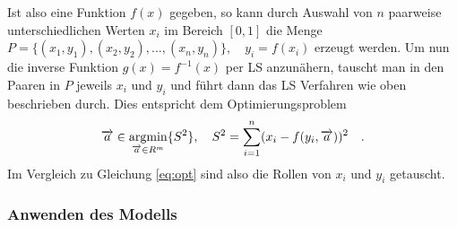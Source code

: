 Ist also eine Funktion $f(x)$ gegeben, so kann durch Auswahl von $n$ paarweise unterschiedlichen Werten $x_i$ im Bereich $[0,1]$ die Menge $P = \{ (x_1, y_1), (x_2, y_2), \dots, (x_n, y_n) \}, \quad y_i = f(x_i)$ erzeugt werden. Um nun die inverse Funktion $g(x) = f^{-1}(x)$ per LS anzunähern, tauscht man in den Paaren in $P$ jeweils $x_i$ und $y_i$ und führt dann das LS Verfahren wie oben beschrieben durch. Dies entspricht dem Optimierungsproblem
\begin{equation}
\begin{split}
\overrightarrow{a} \in \mathop{\mathrm{argmin}}_{\overrightarrow{a} \in R^m} \{ S^2 \}, \quad
S^2 =  \sum_{i=1}^{n} (x_i - f(y_i, \overrightarrow{a}))^2\quad.
\end{split}
\end{equation}
Im Vergleich zu Gleichung \ref{eq:opt} sind also die Rollen von $x_i$ und $y_i$ getauscht.

\subsubsection{Anwenden des Modells}
\label{subsubsec:anwenden}

